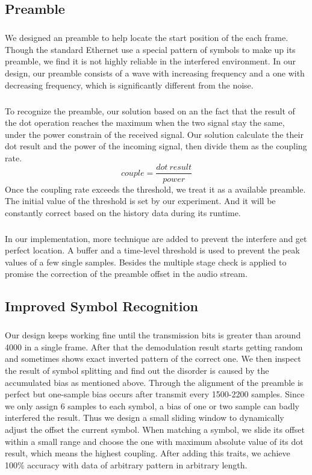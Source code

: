 \subsection{Preamble}
\subparagraph{}
We designed an preamble to help locate the start position of the each frame. Though the standard Ethernet use a special pattern of symbols to make up its preamble, we find it is not highly reliable in the interfered environment. In our design, our preamble consists of a wave with increasing frequency and a one with decreasing frequency, which is significantly different from the noise.

\subparagraph{}
To recognize the preamble, our solution based on an the fact that the result of the dot operation reaches the maximum when the two signal stay the same, under the power constrain of the received signal. Our solution calculate the their dot result and the power of the incoming signal, then divide them as the coupling rate.
\[
    couple = \frac{dot~result}{power}
\]
Once the coupling rate exceeds the threshold, we treat it as a available preamble. The initial value of the threshold is set by our experiment. And it will be constantly correct based on the history data during its runtime.
\subparagraph{}
In our implementation, more technique are added to prevent the interfere and get perfect location. A buffer and a  time-level threshold is used to prevent the peak values of a few single samples. Besides the multiple stage check is applied to promise the correction of the preamble offset in the audio stream.

\subsection{Improved Symbol Recognition}
\subparagraph{}
Our design keeps working fine until the transmission bits is greater than around 4000 in a single frame. After that the demodulation result starts getting random and sometimes shows exact inverted pattern of the correct one. We then inspect the result of symbol splitting and find out the disorder is caused by the accumulated bias as mentioned above. Through the alignment of the preamble is perfect but one-sample bias occurs after transmit every 1500-2200 samples. Since we only assign 6 samples to each symbol, a bias of one or two sample can badly interfered the result. Thus we design a small sliding window to dynamically adjust the offset the current symbol. When matching a symbol, we slide its offset within a small range and choose the one with maximum absolute value of its dot result, which means the highest coupling. After adding this traits, we achieve 100\% accuracy with data of arbitrary pattern in arbitrary length.

